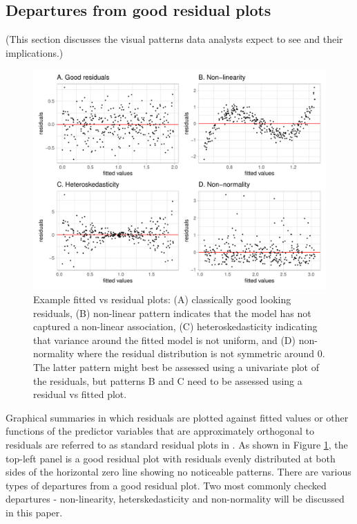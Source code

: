 \documentclass[]{interact}
\theoremstyle{plain}%
\theoremstyle{definition}
\theoremstyle{remark}
\begin{document}
\hypertarget{departures-from-good-residual-plots}{%
\subsection{Departures from good residual
plots}\label{departures-from-good-residual-plots}}

(This section discusses the visual patterns data analysts expect to see
and their implications.)

\begin{figure}
\includegraphics[width=1\linewidth]{paper_comparison_files/figure-latex/commondepartures-1} \caption{Example fitted vs residual plots: (A) classically good looking residuals, (B) non-linear pattern indicates that the model has not captured a non-linear association, (C) heteroskedasticity indicating that variance around the fitted model is not uniform, and (D) non-normality where the residual distribution is not symmetric around 0. The latter pattern might best be assessed using a univariate plot of the residuals, but patterns B and C need to be assessed using a residual vs fitted plot.}\label{fig:commondepartures}
\end{figure}

Graphical summaries in which residuals are plotted against fitted values
or other functions of the predictor variables that are approximately
orthogonal to residuals are referred to as standard residual plots in
\citet{cook1982residuals}. As shown in Figure
\ref{fig:commondepartures}, the top-left panel is a good residual plot
with residuals evenly distributed at both sides of the horizontal zero
line showing no noticeable patterns. There are various types of
departures from a good residual plot. Two most commonly checked
departures - non-linearity, heterskedasticity and non-normality will be
discussed in this paper.
\end{document}

